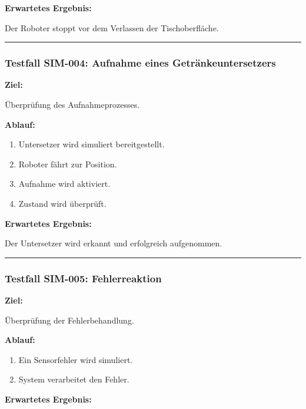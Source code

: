 \documentclass[
  a4paper,
  12pt,
  DIV=12,        %
  parskip=half,  %
  headings=small %
]{scrartcl}
\theoremstyle{definition}
\providecommand{\tightlist}{%
  \setlength{\itemsep}{0pt}\setlength{\parskip}{0pt}}
\theoremstyle{definition}
\providecommand{\tightlist}{%
  \setlength{\itemsep}{0pt}\setlength{\parskip}{0pt}}
\begin{document}
\textbf{Erwartetes Ergebnis:}

Der Roboter stoppt vor dem Verlassen der Tischoberfläche.

\begin{center}\rule{0.5\linewidth}{0.5pt}\end{center}

\subsubsection{Testfall SIM-004: Aufnahme eines
Getränkeuntersetzers}\label{testfall-sim-004-aufnahme-eines-getruxe4nkeuntersetzers}

\textbf{Ziel:}

Überprüfung des Aufnahmeprozesses.

\textbf{Ablauf:}

\begin{enumerate}
\def\labelenumi{\arabic{enumi}.}
\tightlist
\item
  Untersetzer wird simuliert bereitgestellt.
\item
  Roboter fährt zur Position.
\item
  Aufnahme wird aktiviert.
\item
  Zustand wird überprüft.
\end{enumerate}

\textbf{Erwartetes Ergebnis:}

Der Untersetzer wird erkannt und erfolgreich aufgenommen.

\begin{center}\rule{0.5\linewidth}{0.5pt}\end{center}

\subsubsection{Testfall SIM-005:
Fehlerreaktion}\label{testfall-sim-005-fehlerreaktion}

\textbf{Ziel:}

Überprüfung der Fehlerbehandlung.

\textbf{Ablauf:}

\begin{enumerate}
\def\labelenumi{\arabic{enumi}.}
\tightlist
\item
  Ein Sensorfehler wird simuliert.
\item
  System verarbeitet den Fehler.
\end{enumerate}

\textbf{Erwartetes Ergebnis:}
\end{document}
